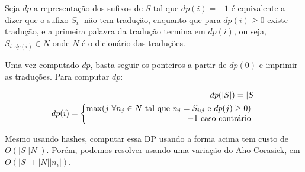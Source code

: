 Seja $dp$ a representação dos sufixos de $S$ tal que $dp(i) = -1$ é equivalente a dizer que
o sufixo $S_{i:}$ não tem tradução, enquanto que para $dp(i) \ge 0$ existe tradução, e a primeira palavra
da tradução termina em $dp(i)$, ou seja, $S_{i:dp(i)} \in N$ onde $N$ é o dicionário das traduções.

Uma vez computado $dp$, basta seguir os ponteiros a partir de $dp(0)$ e imprimir as traduções.
Para computar $dp$:

\begin{align*}
    dp(|S|) = |S|\\
    dp(i) = \left\{\begin{array}{@{}r}
        \max(j \text{ }\forall n_j \in N \text{ tal que } n_j = S_{i:j} \text{ e } dp(j) \ge 0)\\ 
        -1 \text{ caso contrário}
     \end{array}\right.
\end{align*}

Mesmo usando hashes, computar essa DP usando a forma acima tem custo de $O(|S||N|)$. Porém, podemos
resolver usando uma variação do Aho-Corasick, em $O(|S| + |N||n_i|)$.

